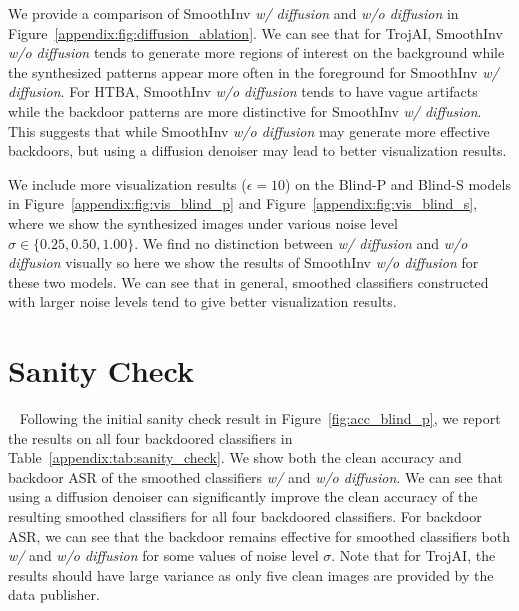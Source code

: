 \documentclass[10pt,twocolumn,letterpaper]{article}
\begin{document}
We provide a comparison of SmoothInv \textit{w/ diffusion} and \textit{w/o diffusion} in Figure~\ref{appendix:fig:diffusion_ablation}. We can see that for TrojAI, SmoothInv \textit{w/o diffusion} tends to generate more regions of interest on the background while the synthesized patterns appear more often in the foreground for SmoothInv \textit{w/ diffusion}. For HTBA, SmoothInv \textit{w/o diffusion} tends to have vague artifacts while the backdoor patterns are more distinctive for SmoothInv \textit{w/ diffusion}. This suggests that while SmoothInv \textit{w/o diffusion} may generate more effective backdoors, but using a diffusion denoiser may lead to better visualization results.

We include more visualization results ($\epsilon=10$) on the Blind-P and Blind-S models in Figure~\ref{appendix:fig:vis_blind_p} and Figure~\ref{appendix:fig:vis_blind_s}, where we show the synthesized images under various noise level $\sigma\in\{0.25, 0.50, 1.00\}$. We find no distinction between \textit{w/ diffusion} and \textit{w/o diffusion} visually so here we show the results of SmoothInv \textit{w/o diffusion} for these two models. 
We can see that in general, smoothed classifiers constructed with larger noise levels tend to give better visualization results.






\section{Sanity Check}~\label{appendix:sanity_check}
Following the initial sanity check result in Figure~\ref{fig:acc_blind_p}, we report the results on all four backdoored classifiers in Table~\ref{appendix:tab:sanity_check}. We show both the clean accuracy and backdoor ASR of the smoothed classifiers \textit{w/ } and \textit{w/o diffusion}. 
We can see that using a diffusion denoiser can significantly improve the clean accuracy of the resulting smoothed classifiers for all four backdoored classifiers. For backdoor ASR, we can see that the backdoor remains effective for smoothed classifiers both \textit{w/} and \textit{w/o diffusion} for some values of noise level $\sigma$.  
Note that for TrojAI, the results should have large variance as only five clean images are provided by the data publisher. 
\end{document}
